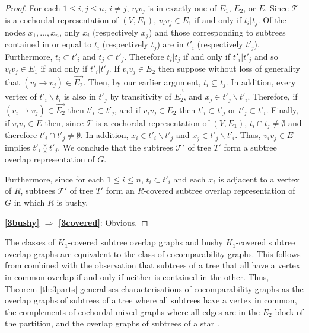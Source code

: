 \documentclass[
final
]{dmtcs-episciences}        \usepackage{graphics, amsthm, amsmath, amssymb, algorithm, algorithmic}
\begin{document}
\begin{proof}
For each $1 \le i,j \le n$, $i \ne j$, $v_i v_j$ is in exactly one of $E_1$, $E_2$, or $E$.
Since $\mathcal{T}$ is a cochordal representation of $(V,E_1)$, $v_i v_j \in E_1$ if and only if $t_i | t_j$.
Of the nodes $x_1, \ldots, x_n$, only $x_i$ (respectively $x_j$) and those corresponding to subtrees contained in or equal to $t_i$ (respectively $t_j$) are in $t'_i$ (respectively $t'_j$). Furthermore, $t_i \subset t'_i$ and $t_j \subset t'_j$. Therefore $t_i | t_j$ if and only if  $t'_i | t'_j$ and so $v_i v_j \in E_1$ if and only if $t'_i | t'_j$.
If $v_i v_j \in E_2$ then suppose without loss of generality that $(v_i \rightarrow v_j) \in \overrightarrow{E_2}$. Then, by our earlier argument, $t_i \subseteq t_j$. In addition, every vertex of $t'_i \backslash t_i$ is also in $t'_j$ by transitivity of  $\overrightarrow{E_2}$, and $x_j \in t'_j \backslash t'_i$.
Therefore, 
if $(v_i \rightarrow v_j) \in \overrightarrow{E_2}$ then $t'_i \subset t'_j$, and
if $v_i v_j \in E_2$ then $t'_i \subset t'_j$ or $t'_j \subset t'_i$.
Finally, if $v_i v_j \in E$ then,
since $\mathcal{T}$ is a cochordal representation of $(V,E_1)$, $t_i \cap t_j \ne \emptyset$ and therefore 
$t'_i \cap t'_j \ne \emptyset$. In addition, $x_i \in t'_i \backslash t'_j$ and $x_j \in t'_j \backslash t'_i$.
Thus,  $v_i v_j \in E$ implies $t'_i \between t'_j$. We conclude that the subtrees $\mathcal T'$ of tree $T'$ form a subtree overlap representation of $G$.

Furthermore, since for each $1 \le i \le n$, $t_i \subset t'_i$ and each $x_i$ is adjacent to a vertex of $R$, subtrees $\mathcal{T}'$ of tree $T'$ form an $R$-covered subtree overlap representation of $G$ in which $R$ is bushy.

\textbf{\ref{3bushy} $\Rightarrow$ \ref{3covered}}: Obvious.
\end{proof}

The classes of $K_1$-covered subtree overlap graphs and bushy $K_1$-covered subtree overlap graphs are equivalent to the class of cocomparability graphs. 
This follows from \cite{GolSch} combined with the observation that subtrees of a tree that all have a vertex in common overlap if and only if neither is contained in the other.
Thus, Theorem \ref{th:3parts}
generalises characterisations of cocomparability graphs as the overlap graphs of subtrees of a tree where all subtrees have a vertex in common, the complements of cochordal-mixed graphs where all edges are in the $E_2$ block of the partition, and the overlap graphs of subtrees of a star \cite{eowynStewart, gavril2000, GolSch}.
\end{document}
